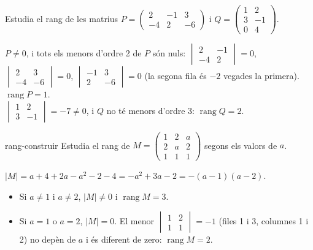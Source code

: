 \begin{apartats}

Estudia el rang de les matrius $P=\begin{pmatrix}2&-1&3\\-4&2&-6\end{pmatrix}$ i
$Q=\begin{pmatrix}1&2\\3&-1\\0&4\end{pmatrix}$.

\begin{solucio}
$P\ne0$, i tots els menors d'ordre 2 de $P$ són nuls:
$\begin{vmatrix}2&-1\\-4&2\end{vmatrix}=0$, $\begin{vmatrix}2&3\\-4&-6\end{vmatrix}=0$,
$\begin{vmatrix}-1&3\\2&-6\end{vmatrix}=0$ (la segona fila és $-2$ vegades la primera). $\operatorname{rang}P=1$.\\
$\begin{vmatrix}1&2\\3&-1\end{vmatrix}=-7\ne0$, i $Q$ no té menors d'ordre 3: $\operatorname{rang}Q=2$.
\end{solucio}

\begin{tria}{rang-construir}
Estudia el rang de $M=\begin{pmatrix}1&2&a\\2&a&2\\1&1&1\end{pmatrix}$ segons els valors de $a$.

\begin{solucio}
$|M|=a+4+2a-a^2-2-4=-a^2+3a-2=-(a-1)(a-2)$.
\begin{itemize}
\item Si $a\ne1$ i $a\ne2$, $|M|\ne0$ i $\operatorname{rang}M=3$.
\item Si $a=1$ o $a=2$, $|M|=0$. El menor $\begin{vmatrix}1&2\\1&1\end{vmatrix}=-1$ (files 1 i 3,
columnes 1 i 2) no depèn de $a$ i és diferent de zero: $\operatorname{rang}M=2$.
\end{itemize}
\end{solucio}


\end{tria}
\end{apartats}
